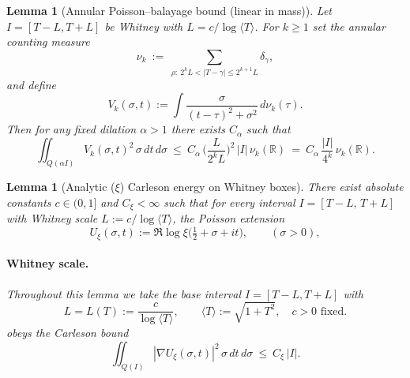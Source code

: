 \documentclass[11pt]{article}
\newtheorem{lemma}[theorem]{Lemma}
\theoremstyle{definition}
\theoremstyle{remark}
\newcommand{\R}{\mathbb{R}}
\begin{document}
\begin{lemma}[Annular Poisson–balayage bound (linear in mass)]\label{lem:annular-balayage}
Let $I=[T-L,T+L]$ be Whitney with $L=c/\log\langle T\rangle$. For $k\ge1$ set the annular counting measure
\[\nu_k\ :=\ \sum_{\rho:\ 2^kL<|T-\gamma|\le 2^{k+1}L}\!\delta_\gamma,\]
and define
\[
  V_k(\sigma,t):=\int\frac{\sigma}{(t-\tau)^2+\sigma^2}\,d\nu_k(\tau).
\]
Then for any fixed dilation $\alpha>1$ there exists $C_\alpha$ such that
\[
  \iint_{Q(\alpha I)} V_k(\sigma,t)^2\,\sigma\,dt\,d\sigma\ \le\ C_\alpha\,\Big(\frac{L}{2^kL}\Big)^{\!2}\,|I|\,\nu_k(\R)
  \ =\ C_\alpha\,\frac{|I|}{4^k}\,\nu_k(\R).
\]
\end{lemma}

\begin{lemma}[Analytic ($\xi$) Carleson energy on Whitney boxes]\label{lem:carleson-xi}
There exist absolute constants $c\in(0,1]$ and $C_\xi<\infty$ such that for every interval $I=[T-L,\,T+L]$ with Whitney scale $L:=c/\log\langle T\rangle$, the Poisson extension
\[
 U_{\xi}(\sigma,t):=\Re\log\xi\big(\tfrac12+\sigma+it\big),\qquad (\sigma>0),
\]
\paragraph{Whitney scale.}
Throughout this lemma we take the base interval $I=[T-L,T+L]$ with
\[
  L=L(T):=\frac{c}{\log\langle T\rangle},\qquad \langle T\rangle:=\sqrt{1+T^2},\quad c>0\text{ fixed.}
\]
obeys the Carleson bound
\[ \iint_{Q(I)} |\nabla U_{\xi}(\sigma,t)|^2\,\sigma\,dt\,d\sigma\ \le\ C_\xi\,|I|. \]
\end{lemma}
\end{document}
